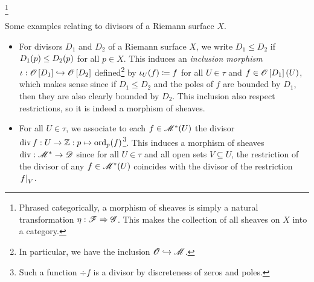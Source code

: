 \documentclass[../Moduli_Spaces_of_Riemann_Surfaces.tex]{subfiles}
\begin{document}
    \footnote{Phrased categorically, a morphism of sheaves is simply a natural transformation $\eta:\mathscr{F}\Rightarrow\mathscr{G}$. This makes the collection of all sheaves on $X$ into a category.}
    \begin{example}
        Some examples relating to divisors of a Riemann surface $X$.
        \begin{itemize}
            \item For divisors $D_1$ and $D_2$ of a Riemann surface $X$, we write $D_1\leq D_2$ if $D_1\!\left(p\right)\leq D_2\!\left(p\right)$ for all $p\in X$. This induces an \textit{inclusion morphism} $\iota:\mathscr{O}\left[D_1\right]\hookrightarrow\mathscr{O}\left[D_2\right]$ defined\footnote{In particular, we have the inclusion $\mathscr{O}\hookrightarrow\mathscr{M}$.} by $\iota_U\!\left(f\right)\coloneqq f$ for all $U\in\tau$ and $f\in\mathscr{O}\left[D_1\right]\left(U\right)$, which makes sense since if $D_1\leq D_2$ and the poles of $f$ are bounded by $D_1$, then they are also clearly bounded by $D_2$. This inclusion also respect restrictions, so it is indeed a morphism of sheaves.
            \item For all $U\in\tau$, we associate to each $f\in\mathscr{M}^\ast\!\left(U\right)$ the divisor $\operatorname{div} f:U\to\mathbb{Z}:p\mapsto\operatorname{ord}_p\!\left(f\right)$\footnote{Such a function $\div f$ is a divisor by discreteness of zeros and poles.}. This induces a morphism of sheaves $\operatorname{div}:\mathscr{M}^\ast\to\mathscr{D}$ since for all $U\in\tau$ and all open sets $V\subseteq U$, the restriction of the divisor of any $f\in\mathscr{M}^\ast\!\left(U\right)$ coincides with the divisor of the restriction $\left.f\right|_V$.\exqed
        \end{itemize}
    \end{example}
\end{document}
